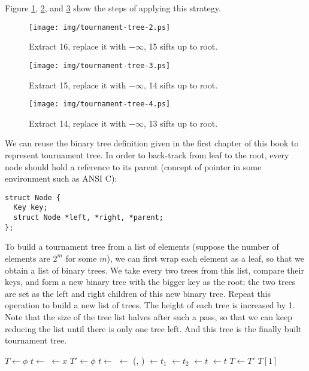 \documentclass{article}
\begin{document}
Figure \ref{fig:tournament-tree-2}, \ref{fig:tournament-tree-3}, and \ref{fig:tournament-tree-4}
show the steps of applying this strategy.

\begin{figure}[htbp]
  \centering
  \texttt{[image: img/tournament-tree-2.ps]}
  \caption{Extract 16, replace it with $-\infty$, 15 sifts up to root.}
  \label{fig:tournament-tree-2}
\end{figure}

\begin{figure}[htbp]
  \centering
  \texttt{[image: img/tournament-tree-3.ps]}
  \caption{Extract 15, replace it with $-\infty$, 14 sifts up to root.}
  \label{fig:tournament-tree-3}
\end{figure}

\begin{figure}[htbp]
  \centering
  \texttt{[image: img/tournament-tree-4.ps]}
  \caption{Extract 14, replace it with $-\infty$, 13 sifts up to root.}
  \label{fig:tournament-tree-4}
\end{figure}

We can reuse the binary tree definition given in the first chapter of this book to represent
tournament tree. In order to back-track from leaf to the root, every node should hold a reference
to its parent (concept of pointer in some environment such as ANSI C):

\lstset{language=C}
\begin{lstlisting}
struct Node {
  Key key;
  struct Node *left, *right, *parent;
};
\end{lstlisting}

To build a tournament tree from a list of elements (suppose the number of elements are $2^m$ for some $m$),
we can first wrap each element as a leaf, so that we obtain a list of binary trees. We take every two
trees from this list, compare their keys, and form a new binary tree with the bigger key as the root;
the two trees are set as the left and right children of this new binary tree. Repeat this operation
to build a new list of trees. The height of each tree is increased by 1. Note that the size of the tree
list halves after such a pass, so that we can keep reducing the list until there is only one tree left.
And this tree is the finally built tournament tree.

\begin{algorithmic}
  \State $T \gets \phi$
    \State $t \gets $ 
    \State {} $\gets x$
    \State {}
  \EndFor
    \State $T' \gets \phi$
      \State $t \gets $ 
      \State {} $\gets$ (, )
      \State {} $\gets t_1$
      \State {} $\gets t_2$
      \State {} $\gets t$
      \State {} $\gets t$
      \State {}
    \EndFor
    \State $T \gets T'$
  \EndWhile
  \State \Return $T[1]$
\EndFunction
\end{algorithmic}
\end{document}
